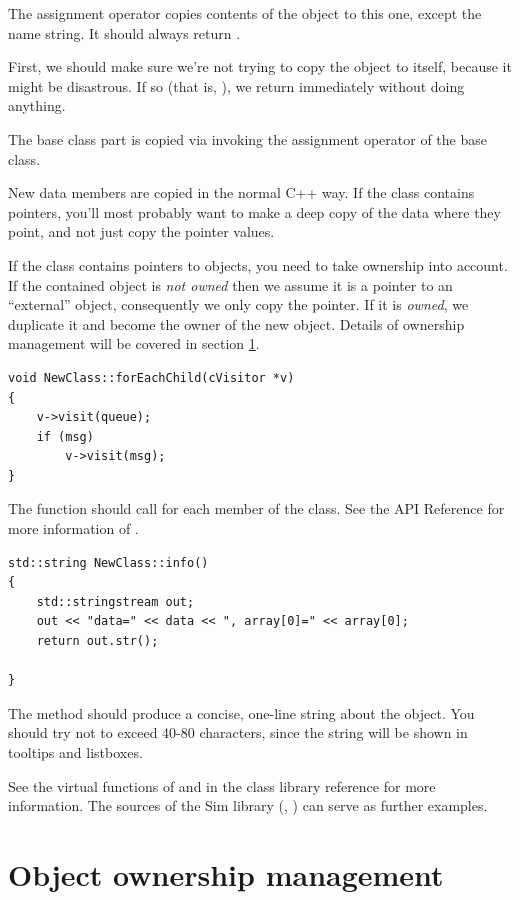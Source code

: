 The assignment operator copies contents of the  object
to this one, except the name string. It should always return
.

First, we should make sure we're not trying to copy the object
to itself, because it might be disastrous. If so (that is,
), we return immediately without doing anything.

The base class part is copied via invoking the assignment operator of
the base class.

New data members are copied in the normal C++ way. If the class
contains pointers, you'll most probably want to make a deep copy of
the data where they point, and not just copy the pointer values.

If the class contains pointers to {\opp} objects, you need
to take ownership into account. If the contained object is \textit{not owned}
then we assume it is a pointer to an ``external'' object, consequently
we only copy the pointer. If it is \textit{owned}, we duplicate
it and become the owner of the new object. Details of ownership
management will be covered in section \ref{sec:ch-sim-lib:ownership-management}.


\begin{verbatim}
void NewClass::forEachChild(cVisitor *v)
{
    v->visit(queue);
    if (msg)
        v->visit(msg);
}
\end{verbatim}

The  function should call 
for each  member of the class. See the API Reference for more
information of .

\begin{verbatim}
std::string NewClass::info()
{
    std::stringstream out;
    out << "data=" << data << ", array[0]=" << array[0];
    return out.str();

}
\end{verbatim}

The  method should produce a concise, one-line string
about the object. You should try not to exceed 40-80 characters, since the
string will be shown in tooltips and listboxes.

See the virtual functions of  and 
in the class library reference for more information. The sources of the
Sim library (, ) can serve as further examples.



\section{Object ownership management}
\label{sec:ch-sim-lib:ownership-management}


